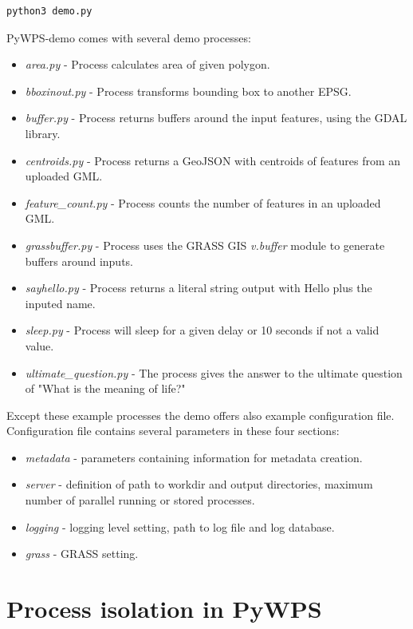 \documentclass[12pt,a4paper]{article}
\begin{document}
\bigskip
\begin{lstlisting}[basicstyle=\small,caption={Starting PyWPS-demo server},label={lst:demo_start}]
python3 demo.py
\end{lstlisting}

PyWPS-demo comes with several demo processes:
\begin{itemize}
\item \textit{area.py} - Process calculates area of given polygon.
\item \textit{bboxinout.py} - Process transforms bounding box to another EPSG.
\item \textit{buffer.py} - Process returns buffers around the input features, using the GDAL library.
\item \textit{centroids.py} - Process returns a GeoJSON with centroids of features from  an uploaded GML.
\item \textit{feature\_count.py} - Process counts the number of features in an uploaded GML.
\item \textit{grassbuffer.py} - Process uses the  GRASS GIS \textit{v.buffer} module to generate buffers around inputs.
\item \textit{sayhello.py} - Process returns a literal string output with Hello plus the inputed name.
\item \textit{sleep.py} - Process will sleep for a given delay or 10 seconds if not a valid value.
\item \textit{ultimate\_question.py} - The process gives the answer to the ultimate question of "What is the meaning of life?"
\end{itemize}

Except these example processes the demo offers also example configuration file. Configuration file contains several parameters in
these four sections:
\begin{itemize}
\item \textit{metadata} - parameters containing information for metadata creation.
\item \textit{server} - definition of path to workdir and output directories, maximum number of parallel running or stored processes. 
\item \textit{logging} - logging level setting, path to log file and log database.
\item \textit{grass} - GRASS setting.
\end{itemize}



\newpage
\section{Process isolation in PyWPS}
\end{document}
